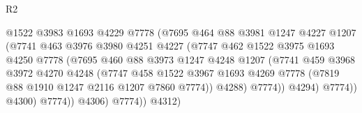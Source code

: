 \begin{lexlean}{R2}
\begin{coremodule}
                                    @1522
                                    @3983
                                    @1693
                                    @4229
                                    @7778
                                    (@7695
                                      @464
                                      @88
                                      @3981
                                      @1247
                                      @4227
                                      @1207
                                      (@7741
                                        @463
                                        @3976
                                        @3980
                                        @4251
                                        @4227
                                        (@7747
                                          @462
                                          @1522
                                          @3975
                                          @1693
                                          @4250
                                          @7778
                                          (@7695
                                            @460
                                            @88
                                            @3973
                                            @1247
                                            @4248
                                            @1207
                                            (@7741
                                              @459
                                              @3968
                                              @3972
                                              @4270
                                              @4248
                                              (@7747
                                                @458
                                                @1522
                                                @3967
                                                @1693
                                                @4269
                                                @7778
                                                (@7819 @88 @1910 @1247 @2116 @1207 @7860 @7774))
                                              @4288)
                                            @7774))
                                        @4294)
                                      @7774))
                                  @4300)
                                @7774))
                            @4306)
                          @7774))
                      @4312)

\end{coremodule}
\end{lexlean}
